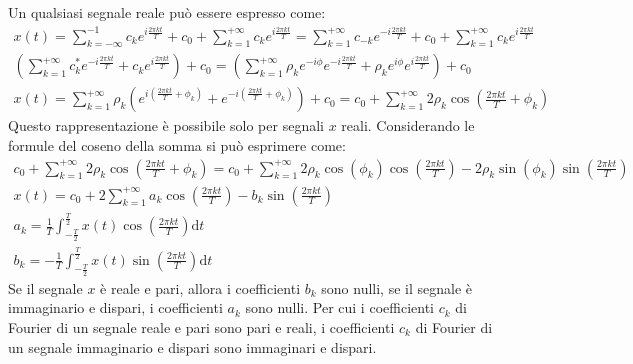 \documentclass{article}
\newcommand{\df}{\mathrm{d}}
\numberwithin{equation}{subsection}
\begin{document}
Un qualsiasi segnale reale può essere espresso come:
\begin{gather*}
    x(t)=\displaystyle\sum_{k=-\infty}^{-1}c_ke^{i\frac{2\pi kt}{T}}+c_0+\sum_{k=1}^{+\infty}c_ke^{i\frac{2\pi kt}{T}}=\sum_{k=1}^{+\infty}c_{-k}e^{-i\frac{2\pi kt}{T}}+c_0+\sum_{k=1}^{+\infty}c_ke^{i\frac{2\pi kt}{T}}\\
    \displaystyle\left(\sum_{k=1}^{+\infty}c_k^*e^{-i\frac{2\pi kt}{T}}+c_ke^{i\frac{2\pi kt}{T}}\right)+c_0=\left(\sum_{k=1}^{+\infty}\rho_k e^{-i\phi}e^{-i\frac{2\pi kt}{T}}+\rho_ke^{i\phi}e^{i\frac{2\pi kt}{T}}\right)+c_0\\
    x(t)=\displaystyle\sum_{k=1}^{+\infty}\rho_k \left(e^{i\left(\frac{2\pi kt}{T}+\phi_k\right)}+e^{-i\left(\frac{2\pi kt}{T}+\phi_k\right)}\right)+c_0=\displaystyle c_0+\sum_{k=1}^{+\infty}2\rho_k\cos\left(\frac{2\pi kt}{T}+\phi_k\right)
\end{gather*}
Questo rappresentazione è possibile solo per segnali $x$ reali. 
Considerando le formule del coseno della somma si può esprimere come:
\begin{gather*}
    \displaystyle c_0+\sum_{k=1}^{+\infty}2\rho_k\cos\left(\frac{2\pi kt}{T}+\phi_k\right)=
    c_0+\sum_{k=1}^{+\infty}2\rho_k\cos(\phi_k)\cos\left(\frac{2\pi kt}{T}\right)-2\rho_k\sin(\phi_k)\sin\left(\frac{2\pi kt}{T}\right)\\
    x(t)=\displaystyle c_0+2\sum_{k=1}^{+\infty}a_k\cos\left(\frac{2\pi kt}{T}\right)-b_k\sin\left(\frac{2\pi kt}{T}\right)\\
    a_k=\displaystyle\frac{1}{T}\int_{-\frac{T}{2}}^{\frac{T}{2}}x(t)\cos\left(\frac{2\pi kt}{T}\right)\df t\\
    b_k=\displaystyle-\frac{1}{T}\int_{-\frac{T}{2}}^{\frac{T}{2}}x(t)\sin\left(\frac{2\pi kt}{T}\right)\df t
\end{gather*}
Se il segnale $x$ è reale e pari, allora i coefficienti $b_k$ sono nulli, se il segnale è immaginario e dispari, i coefficienti $a_k$ sono nulli. 
Per cui i coefficienti $c_k$ di Fourier di un segnale reale e pari sono pari e reali, i coefficienti $c_k$ di Fourier di un segnale immaginario e 
dispari sono immaginari e dispari. 

\clearpage
\end{document}
